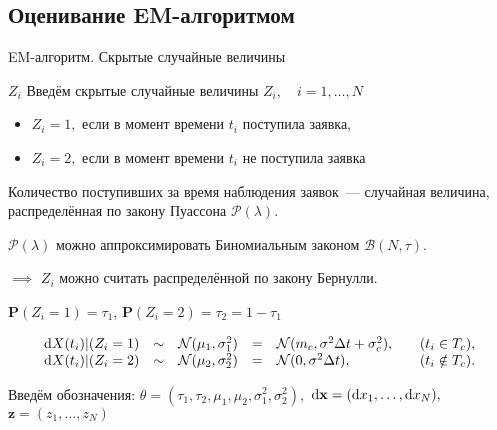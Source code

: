\documentclass[utf8]{beamer}
\begin{document}
\subsection[EM-алгоритм]{Оценивание EM-алгоритмом}
\begin{frame}{EM-алгоритм. Скрытые случайные величины}
\begin{block}{$Z_i$}
  Введём скрытые случайные величины $Z_i, \quad i=1,\ldots,N$
  \begin{itemize}
    \item $Z_i = 1,$ если в момент времени $t_i$ поступила заявка,
    \item $Z_i = 2,$ если в момент времени $t_i$ не поступила заявка
  \end{itemize}
  Количество поступивших за время наблюдения заявок~--- случайная величина, 
  распределённая по закону Пуассона $\mathcal{P}(\lambda).$

  $\mathcal{P}(\lambda)$ можно аппроксимировать Биномиальным законом 
  $\mathcal{B}(N, \tau).$

  $\implies$ $Z_i$ можно считать распределённой по закону Бернулли.

  $\mathbf{P}(Z_i=1) = \tau_1$, $\mathbf{P}(Z_i=2) = \tau_2 = 1 - \tau_1$
\end{block}

$$
\begin{array}{rclcll}
\dif X(t_i) \vert (Z_i = 1) &\sim& \mathcal{N}(\mu_1, \sigma_1^2) &=& 
  \mathcal{N}(m_c, \sigma^2 \Delta t + \sigma_c^2), &
  \quad (t_i \in T_c), \\
\dif X(t_i) \vert (Z_i = 2) &\sim& \mathcal{N}(\mu_2, \sigma_2^2) &=& 
  \mathcal{N}(0, \sigma^2 \Delta t), &
  \quad (t_i \notin T_c).
\end{array}
$$

Введём обозначения: 
$\theta = (\tau_1, \tau_2, \mu_1, \mu_2, \sigma_1^2, \sigma_2^2),$
$\mathbf{\dif x} = (\dif x_1, \ldots, \dif x_N),$
$\mathbf{z} = (z_1, \ldots, z_N)$
\end{frame}
\end{document}
